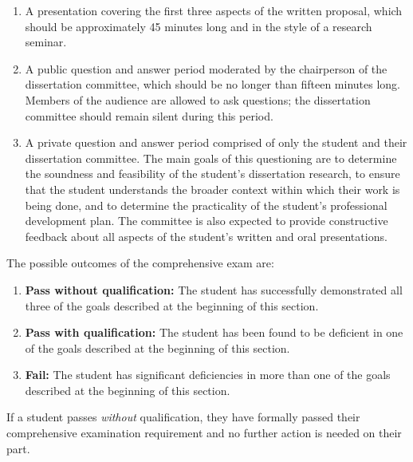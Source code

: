 \begin{enumerate}
\item  A presentation covering the first three aspects of the written
  proposal, which should be approximately 45 minutes long and in the
  style of a research seminar.

\item  A public question and answer period moderated by the
  chairperson of the dissertation committee, which should be no longer than
  fifteen minutes long.  Members of the audience are allowed to ask
  questions; the dissertation committee should remain silent during this
  period.

\item  A private question and answer period comprised of only the
  student and their dissertation committee.  The main goals of this
  questioning are to determine the soundness and feasibility of the
  student's dissertation research, to ensure that the student
  understands the broader context within which their work is being
  done, and to determine the practicality of the student's
  professional development plan.  The committee is also expected to
  provide constructive feedback about all aspects of the student's
  written and oral presentations.

\end{enumerate}

\vspace{2mm}

\noindent
The possible outcomes of the comprehensive exam are:

\begin{enumerate}
\item  \textbf{Pass without qualification:} The student has
  successfully demonstrated all three of the goals described at the
  beginning of this section.

\item  \textbf{Pass with qualification:} The student has been found to
  be deficient in one of the goals described at the beginning of this
  section.

\item  \textbf{Fail:} The student has significant deficiencies in more
  than one of the goals described at the beginning of this section.

\end{enumerate}

If a student passes \textit{without} qualification, they have formally
passed their comprehensive examination requirement and no further
action is needed on their part.

